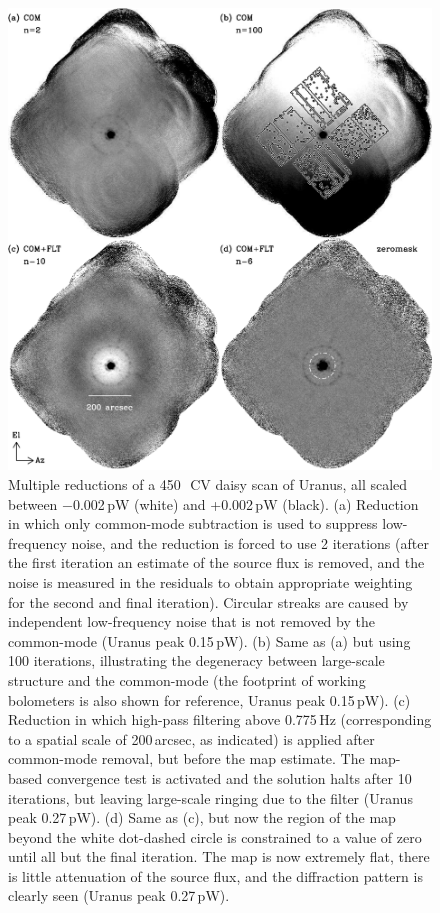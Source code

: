 \documentclass[useAMS,usenatbib,nofootinbib]{mn2e}
\begin{document}
\begin{figure}
\centering
\includegraphics[width=\linewidth]{pointmaps}
\caption{Multiple reductions of a 450\,\micron\ CV daisy scan of
  Uranus, all scaled between $-$0.002\,pW (white) and +0.002\,pW
  (black). (a) Reduction in which only common-mode subtraction is used
  to suppress low-frequency noise, and the reduction is forced to use
  2 iterations (after the first iteration an estimate of the source
  flux is removed, and the noise is measured in the residuals to
  obtain appropriate weighting for the second and final
  iteration). Circular streaks are caused by independent low-frequency
  noise that is not removed by the common-mode (Uranus peak
  0.15\,pW). (b) Same as (a) but using 100 iterations, illustrating the
  degeneracy between large-scale structure and the common-mode (the
  footprint of working bolometers is also shown for reference, Uranus
  peak 0.15\,pW). (c) Reduction in which high-pass filtering above
  0.775\,Hz (corresponding to a spatial scale of 200\,arcsec, as
  indicated) is applied after common-mode removal, but before the map
  estimate. The map-based convergence test is activated and the
  solution halts after 10 iterations, but leaving large-scale ringing
  due to the filter (Uranus peak 0.27\,pW). (d) Same as (c), but now
  the region of the map beyond the white dot-dashed circle is
  constrained to a value of zero until all but the final iteration.
  The map is now extremely flat, there is little attenuation of the
  source flux, and the diffraction pattern is clearly seen (Uranus
  peak 0.27\,pW).}
\label{fig:pointmaps}
\end{figure}
\end{document}
